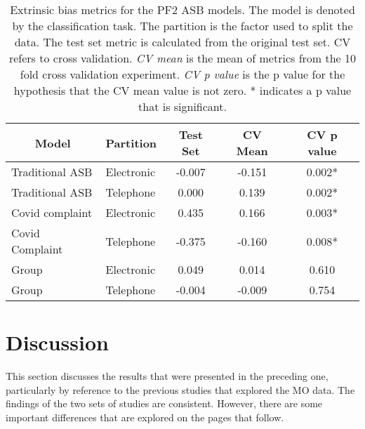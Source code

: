 \begin{table}[]
\begin{tabular}{@{}llccc@{}}
\multicolumn{1}{c}{Model} & \multicolumn{1}{c}{Partition} & Test Set & CV Mean & CV p value \\ \midrule
Traditional ASB                                   & Electronic                                            & -0.007   & -0.151  & 0.002*      \\
Traditional ASB                                   & Telephone                                             & 0.000    & 0.139   & 0.002*      \\
Covid complaint                                   & Electronic                                            & 0.435    & 0.166   & 0.003*      \\
Covid Complaint                                   & Telephone                                             & -0.375   & -0.160  & 0.008*      \\
Group                                         & Electronic                                            & 0.049    & 0.014   & 0.610      \\
Group                                         & Telephone                                             & -0.004   & -0.009  & 0.754      \\ \bottomrule
\end{tabular}
\caption[ASB incident logs Bias Table]{\label{tab:asb_bias} Extrinsic bias metrics for the PF2 ASB models. The model is denoted by the classification task. The partition is the factor used to split the data. The test set metric is calculated from the original test set. CV refers to cross validation. \emph{CV mean} is the mean of metrics from the 10 fold cross validation experiment. \emph{CV p value} is the p value for the hypothesis that the CV mean value is not zero. * indicates a p value that is significant.}
\end{table}

\section{Discussion} This section discusses the results that were presented in the preceding one, particularly by reference to the previous studies that explored the MO data. The findings of the two sets of studies are consistent. However, there are some important differences that are explored on the pages that follow.


